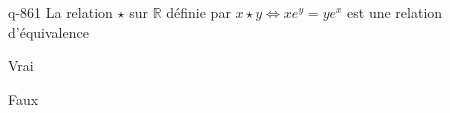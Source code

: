 \begin{truefalse}{q-861}
La relation $\star$ sur $\mathbb R$ définie par $x\star y \iff xe^{y}=ye^{x}$ est une relation d'équivalence
\item* Vrai
\item Faux
\end{truefalse}

